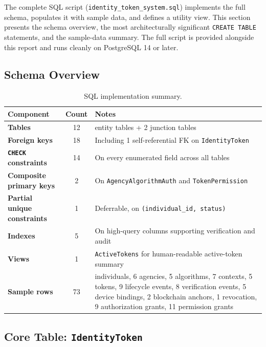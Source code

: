 \documentclass[11pt,letterpaper]{article}
\newcommand{\entity}[1]{\texttt{\color{navydark}#1}}
\newcommand{\thead}[1]{\textbf{\color{white}\small #1}}
\begin{document}
The complete SQL script (\texttt{identity\_token\_system.sql}) implements the full schema, populates it with sample data, and defines a utility view. This section presents the schema overview, the most architecturally significant \texttt{CREATE TABLE} statements, and the sample-data summary. The full script is provided alongside this report and runs cleanly on PostgreSQL 14 or later.

\subsection{Schema Overview}

\begin{table}[H]
\centering
\footnotesize
\caption{SQL implementation summary.}
\setlength{\tabcolsep}{5pt}
\renewcommand{\arraystretch}{1.1}
\begin{tabularx}{\textwidth}{>{\bfseries}p{1.75in} c >{\RaggedRight\arraybackslash}X}
\toprule
\rowcolor{tabheader}
\thead{Component} & \thead{Count} & \thead{Notes} \\
\midrule
Tables & 12 & 10 entity tables + 2 junction tables \\
Foreign keys & 18 & Including 1 self-referential FK on \entity{IdentityToken} \\
\texttt{CHECK} constraints & 14 & On every enumerated field across all tables \\
Composite primary keys & 2 & On \entity{AgencyAlgorithmAuth} and \entity{TokenPermission} \\
Partial unique constraints & 1 & Deferrable, on \texttt{(individual\_id, status)} \\
Indexes & 5 & On high-query columns supporting verification and audit \\
Views & 1 & \texttt{ActiveTokens} for human-readable active-token summary \\
\midrule
Sample rows & 73 & 5 individuals, 6 agencies, 5 algorithms, 7 contexts, 5 tokens, 9 lifecycle events, 8 verification events, 5 device bindings, 2 blockchain anchors, 1 revocation, 9 authorization grants, 11 permission grants \\
\bottomrule
\end{tabularx}
\end{table}

\subsection{Core Table: \texttt{IdentityToken}}
\end{document}

